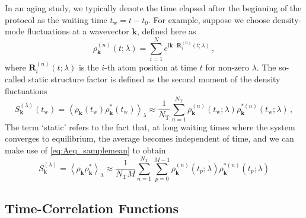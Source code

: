 In an aging study, we typically denote the time elapsed after the beginning of the protocol as the waiting time $t_\mathrm{w} = t-t_0$. For example, suppose we choose density-mode fluctuations at a wavevector $\bm k$, defined here as 
\begin{equation}
\rho_{\bm k}^{(n)}(t; \lambda) = \sum_{i=1}^N e^{\mathrm{i}\bm k \cdot \bm R_i^{(n)}(t; \lambda)} \,,
\end{equation}
where $\bm R_i^{(n)}(t;\lambda)$ is the $i$-th atom position at time $t$ for non-zero $\lambda$. The so-called static structure factor is defined as the second moment of the density fluctuations
\begin{equation}
S^{(\lambda)}_{\bm k}(t_\mathrm{w}) = \left\langle \rho_{\bm k}(t_\mathrm{w})  \rho_{\bm k}^*(t_\mathrm{w})  \right\rangle_\lambda \approx  \frac{1}{N_\mathrm{T}} \sum_{n=1}^{N_\mathrm{T}} \rho_{\bm k}^{(n)}(t_\mathrm{w};\lambda)  \rho_{\bm k}^{*(n)}(t_\mathrm{w};\lambda) \,,
\end{equation}
The term `static' refers to the fact that, at long waiting times where the system converges to equilibrium, the average becomes independent of time, and we can make use of \cref{eq:Aeq_samplemean} to obtain %
\begin{equation}
S^{(\lambda)}_{\bm k} = \left\langle \rho_{\bm k}  \rho_{\bm k}^* \right\rangle_\lambda \approx  \frac{1}{N_\mathrm{T} M} \sum_{n=1}^{N_\mathrm{T}} \sum_{p=0}^{M-1}\rho_{\bm k}^{(n)}(t_p;\lambda)\rho_{\bm k}^{*(n)}(t_p;\lambda) 
\end{equation}

\subsection{Time-Correlation Functions}  \label{app:timecorrel}

